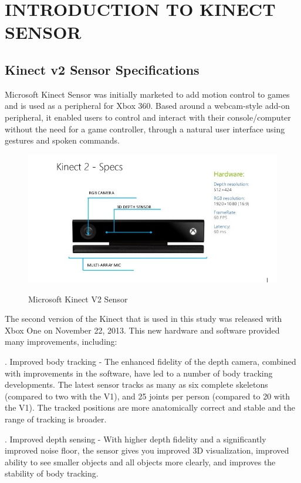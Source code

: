 \chapter{INTRODUCTION TO KINECT SENSOR} \label{INTRODUCTION TO KINECT SENSOR}
\section{Kinect v2 Sensor Specifications} \label{Kinect v2 Sensor Specifications}
\noindent Microsoft Kinect Sensor was initially marketed to add motion control to games and is used as a peripheral for Xbox 360. Based around a webcam-style add-on peripheral, it enabled users to control and interact with their console/computer without the need for a game controller, through a natural user interface using gestures and spoken commands.


\begin{figure}[H]
\centering
{\includegraphics[scale=0.75]{figkinect.png}}
\caption{Microsoft Kinect V2 Sensor}
\end{figure}

\noindent The second version of the Kinect that is used in this study was released with Xbox One on   November 22, 2013. This new hardware and software provided many improvements, including:

.	Improved body tracking - The enhanced fidelity of the depth camera, combined with improvements in the software, have led to a number of body tracking developments. The latest sensor tracks as many as six complete skeletons (compared to two with the V1), and 25 joints per person (compared to 20 with the V1). The tracked positions are more anatomically correct and stable and the range of tracking is broader.

.	Improved depth sensing - With higher depth fidelity and a significantly improved noise floor, the sensor gives you improved 3D visualization, improved ability to see smaller objects and all objects more clearly, and improves the stability of body tracking.

